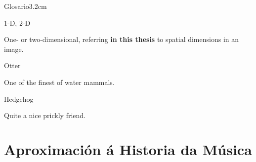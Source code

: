 \documentclass[a4paper, twoside]{templates/ociamthesis}
\begin{document}
\begin{romanpages}
  \dominitoc %

\flushbottom

\tableofcontents

\listoffigures
	\mtcaddchapter

\listoftables
  \mtcaddchapter
\begin{mclistof}{Glosario}{3.2cm}

\item[1-D, 2-D]

One- or two-dimensional, referring \textbf{in this thesis} to spatial dimensions in an image.

\item[Otter]

One of the finest of water mammals.

\item[Hedgehog]

Quite a nice prickly friend.

\end{mclistof} 


\end{romanpages}

\flushbottom

\hypertarget{aproximaciuxf3n-uxe1-historia-da-muxfasica}{%
\chapter*{Aproximación á Historia da Música}\label{aproximaciuxf3n-uxe1-historia-da-muxfasica}}
\end{document}
